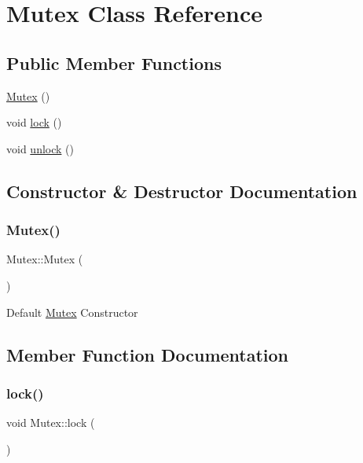 \hypertarget{class_mutex}{}\section{Mutex Class Reference}
\label{class_mutex}
\subsection*{Public Member Functions}
\begin{DoxyCompactItemize}
\item 
\hyperlink{class_mutex_a593423d868daf926c7b0d63a833ae29a}{Mutex} ()
\item 
void \hyperlink{class_mutex_ad91be808bf0a60a16f10b897ec246d3a}{lock} ()
\item 
void \hyperlink{class_mutex_a546a5b797ba29959357586aa2b3740a8}{unlock} ()
\end{DoxyCompactItemize}


\subsection{Constructor \& Destructor Documentation}
\hypertarget{class_mutex_a593423d868daf926c7b0d63a833ae29a}{}\label{class_mutex_a593423d868daf926c7b0d63a833ae29a} 
\subsubsection{\texorpdfstring{Mutex()}{Mutex()}}
{\footnotesize\ttfamily Mutex\+::\+Mutex (\begin{DoxyParamCaption}{ }\end{DoxyParamCaption})\hspace{0.3cm}{\ttfamily [inline]}}

Default \hyperlink{class_mutex}{Mutex} Constructor 

\subsection{Member Function Documentation}
\hypertarget{class_mutex_ad91be808bf0a60a16f10b897ec246d3a}{}\label{class_mutex_ad91be808bf0a60a16f10b897ec246d3a} 
\subsubsection{\texorpdfstring{lock()}{lock()}}
{\footnotesize\ttfamily void Mutex\+::lock (\begin{DoxyParamCaption}{ }\end{DoxyParamCaption})\hspace{0.3cm}{\ttfamily [inline]}}

